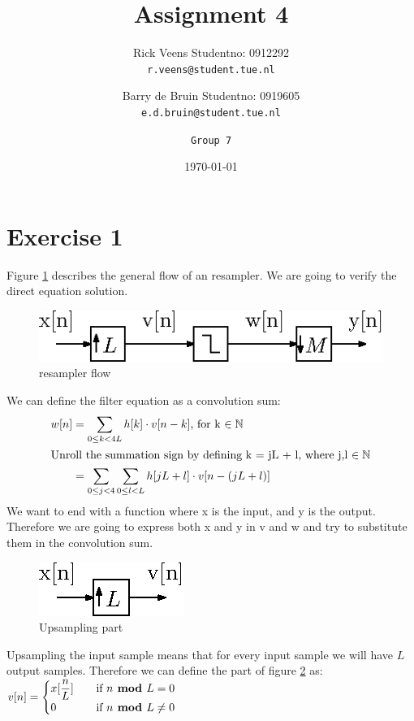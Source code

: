 \documentclass[a4paper,twoside,11pt, fleqn]{article}
\title{\vspace{-\baselineskip}\sffamily\bfseries Assignment 4}
\author{
	Rick Veens \qquad Studentno: 0912292\\
	\texttt{r.veens@student.tue.nl}
	\and
	Barry de Bruin \qquad Studentno: 0919605\\
	\texttt{e.d.bruin@student.tue.nl}
	\and
	\texttt{Group 7}
}
\date{\today}
\begin{document}
\maketitle
\newpage

\tableofcontents

\newpage

\section{Exercise 1}
Figure \ref{fig:flow} describes the general flow of an resampler. We are going to verify the direct equation solution.
\begin{figure}[h]
	\centering
	\includegraphics[scale = 1.3]{Images/3_01}
    \caption{resampler flow}
    \label{fig:flow}
\end{figure}

We can define the filter equation as a convolution sum:
\begin{align*}
w[n] 	&= \sum_{0\leq k < 4L} h[k]\cdot v[n-k]\text{, for k $\in \mathbb{N}$}\\
\intertext{Unroll the summation sign by defining k = jL + l, where j,l  $\in \mathbb{N}$}
		&= \sum_{0\leq j<4}  \sum_{0\leq l<L} h[jL + l]\cdot v[n-(jL+l)]		
\end{align*}
We want to end with a function where x is the input, and y is the output. Therefore we are going to express both x and y in v and w and try to substitute them in the convolution sum.

\begin{figure}[h]
	\centering
	\includegraphics[scale = 1.3]{Images/3_02}
    \caption{Upsampling part}
     \label{fig:up}
\end{figure}

Upsampling the input sample means that for every input sample we will have $L$ output samples. Therefore we can define the part of figure \ref{fig:up} as:\\

$ v[n] =
  \begin{cases}
    x[\dfrac{n}{L}]      & \quad \text{if } n \text{\textbf{ mod }} L = 0\\
    0  					& \quad \text{if } n \text{\textbf{ mod }} L \neq 0\\
  \end{cases}$
\end{document}
